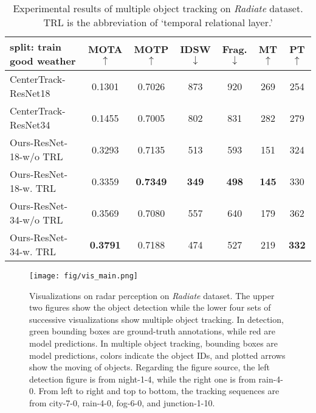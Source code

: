 \documentclass[10pt,twocolumn,letterpaper]{article}
\begin{document}
\begin{table*}
  \caption{Experimental results of multiple object tracking on \textit{Radiate} dataset. TRL is the abbreviation of `temporal relational layer.'}\vspace{-3mm}
  \label{tab:track}
  \centering
  \setlength\tabcolsep{10pt}
  {
  \begin{tabular}{lcccccc}
    \toprule
    








    split: train good weather & MOTA$\uparrow$ & MOTP$\uparrow$ & IDSW$\downarrow$ & Frag.$\downarrow$ & MT$\uparrow$ & PT$\uparrow$ \\
    
    \midrule
    
    CenterTrack-ResNet18 & 0.1301 & 0.7026 & 873 & 920 & 269 & 254 \\
    CenterTrack-ResNet34 & 0.1455 & 0.7005 & 802 & 831 & 282 & 279 \\
    Ours-ResNet-18-w/o TRL & 0.3293 & 0.7135 & 513 & 593 & 151 & 324 \\
    Ours-ResNet-18-w. TRL & 0.3359 & \textbf{0.7349} & \textbf{349} & \textbf{498} & \textbf{145} & 330 \\
    Ours-ResNet-34-w/o TRL & 0.3569 & 0.7080 & 557 & 640 & 179 & 362 \\
    Ours-ResNet-34-w. TRL & \textbf{0.3791} & 0.7188 & 474 & 527 & 219 & \textbf{332} \\
    
    \bottomrule
  \end{tabular}\vspace{-4mm}
  }
\end{table*}

\begin{figure*}[ht]
    \centering
    \texttt{[image: fig/vis\_main.png]}\vspace{-3mm}
    \caption{Visualizations on radar perception on \textit{Radiate} dataset. The upper two figures show the object detection while the lower four sets of successive visualizations show multiple object tracking. In detection, green bounding boxes are ground-truth annotations, while red are model predictions. In multiple object tracking, bounding boxes are model predictions, colors indicate the object IDs, and plotted arrows show the moving of objects. Regarding the figure source, the left detection figure is from night-1-4, while the right one is from rain-4-0. From left to right and top to bottom, the tracking sequences are from city-7-0, rain-4-0, fog-6-0, and junction-1-10.}\vspace{-4mm}
    \label{fig:vis}
\end{figure*}
\end{document}
